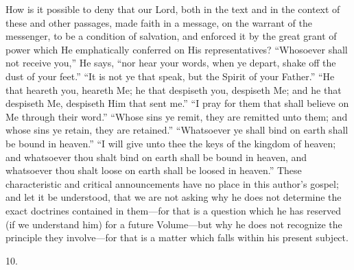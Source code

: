 How is it possible to deny that our Lord, both in
the text and in the context of these and other passages, made faith in
a message, on the warrant of the messenger, to be a condition of
salvation, and enforced it by the great grant of power which He
emphatically conferred on His representatives? ``Whosoever shall not
receive you,'' He says, ``nor hear your words, when ye depart, shake off
the dust of your feet.'' ``It is not ye that speak, but the Spirit of
your Father.'' ``He that heareth you, heareth Me; he that despiseth you,
despiseth Me; and he that despiseth Me, despiseth Him that sent me.'' ``I
pray for them that shall believe on Me through their word.'' ``Whose
sins ye remit, they are remitted unto them; and whose sins ye retain,
they are retained.'' ``Whatsoever ye shall bind on earth shall be bound
in heaven.'' ``I will give unto thee the keys of the kingdom of heaven;
and whatsoever thou shalt bind on earth shall be bound in heaven, and
whatsoever thou shalt loose on earth shall be loosed in heaven.'' These
characteristic and critical announcements have no place in this author's
gospel; and let it be understood, that we are not asking why he does
not determine the exact doctrines contained in them—for that is a
question which he has reserved (if we understand him) for a future
Volume—but why he does not recognize the principle they
involve—for that is a matter which falls within his present subject.

10.

